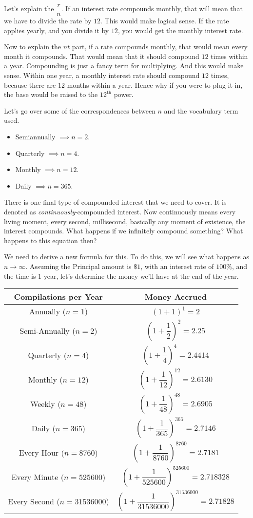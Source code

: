 \documentclass[../book.tex]{subfiles}
\begin{document}
Let’s explain the $\dfrac{r}{n}$.  If an interest rate compounds monthly, that will mean that we have to divide the rate by $12$.  This would make logical sense.  If the rate applies yearly, and you divide it by $12$, you would get the monthly interest rate.  

Now to explain the $nt$ part, if a rate compounds monthly, that would mean every month it compounds.  That would mean that it should compound $12$ times within a year.  Compounding is just a fancy term for multiplying.  And this would make sense.  Within one year, a monthly interest rate should compound $12$ times, because there are $12$ months within a year.  Hence why if you were to plug it in, the base would be raised to the $12^{\text{th}}$ power.  

Let's go over some of the correspondences between $n$ and the vocabulary term used.  \begin{itemize}
    \item Semiannually $\implies n=2$.
    \item Quarterly $\implies n=4$.
    \item Monthly $\implies n=12$.
    \item Daily $\implies n=365$.
\end{itemize}

There is one final type of compounded interest that we need to cover.  It is denoted as \textit{continuously}-compounded interest.  Now continuously means every living moment, every second, millisecond, basically any moment of existence, the interest compounds.  What happens if we infinitely compound something?  What happens to this equation then?

We need to derive a new formula for this.  To do this, we will see what happens as $n\to\infty$.  Assuming the Principal amount is $\$1$, with an interest rate of $100\%$, and the time is $1$ year, let's determine the money we'll have at the end of the year.

\begin{tabular}{||c|c||}
    \hline
    Compilations per Year & Money Accrued \\
    \hline
    Annually ($n=1$) & $(1+1)^1=2$ \\
    \hline
    Semi-Annually ($n=2$) & $\left(1+\dfrac{1}{2}\right)^{2}=2.25$ \\
    \hline
    Quarterly ($n=4$) & $\left(1+\dfrac{1}{4}\right)^{4}=2.4414$ \\
    \hline
    Monthly ($n=12$) & $\left(1+\dfrac{1}{12}\right)^{12}=2.6130$ \\
    \hline
    Weekly ($n=48$) & $\left(1+\dfrac{1}{48}\right)^{48}=2.6905$ \\
    \hline
    Daily ($n=365$) & $\left(1+\dfrac{1}{365}\right)^{365}=2.7146$ \\
    \hline
    Every Hour ($n=8760$) & $\left(1+\dfrac{1}{8760}\right)^{8760}=2.7181$ \\
    \hline
    Every Minute ($n=525600$) & $\left(1+\dfrac{1}{525600}\right)^{525600}=2.718328$ \\
    \hline
    Every Second ($n=31536000$) & $\left(1+\dfrac{1}{31536000}\right)^{31536000}=2.71828$ \\
    \hline
\end{tabular}
\end{document}
